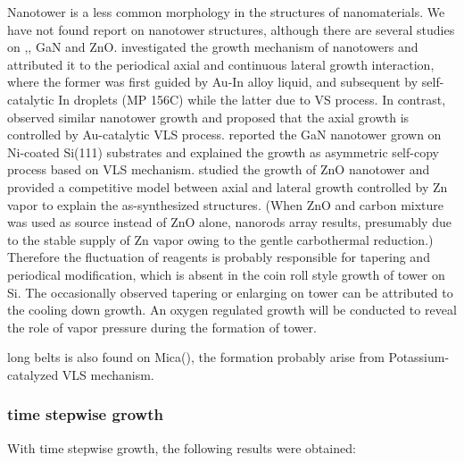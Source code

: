 Nanotower is a less common morphology in the structures of nanomaterials.\cite{Kharissova2010} We have not found report on   nanotower structures, although there are several studies on ,\cite{Jean2010,Yan2007}, GaN\cite{Xiao2012} and ZnO\cite{Zhang2013c}. \citeauthor{Jean2010} investigated the growth mechanism of  nanotowers and attributed it to the periodical axial and continuous lateral growth interaction, where the former was first guided by Au-In alloy liquid, and subsequent by self-catalytic In droplets (MP 156C) while the latter due to VS process. In contrast, \citeauthor{Yan2007} observed similar  nanotower growth and proposed that the axial growth is controlled by Au-catalytic VLS process. \citeauthor{Xiao2012} reported the GaN nanotower grown on Ni-coated Si(111) substrates and explained the growth as asymmetric self-copy process based on VLS mechanism. \citeauthor{Zhang2013c} studied the growth of ZnO nanotower and provided a competitive model between axial and lateral growth controlled by Zn vapor to explain the as-synthesized structures. (When ZnO and carbon mixture was used as source instead of ZnO alone, nanorods array results, presumably due to the stable supply of Zn vapor owing to the gentle carbothermal reduction.) Therefore the fluctuation of reagents is probably responsible for tapering and periodical modification, which is absent in the coin roll style growth of  tower on Si. The occasionally observed tapering or enlarging on  tower can be attributed to the cooling down growth.  An oxygen regulated growth will be conducted to reveal the role of vapor pressure during the formation of tower.

long belts  is also found on Mica(), the formation probably arise from Potassium-catalyzed VLS mechanism.\cite{Hu2011}

\subsubsection{time stepwise growth}

With time stepwise growth, the following results were obtained:


